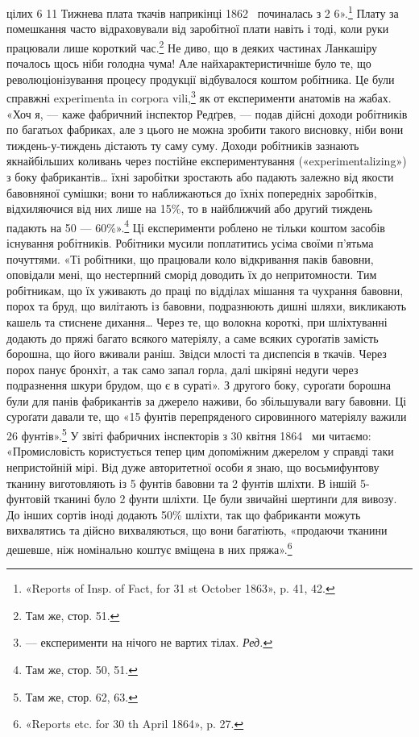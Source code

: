\parcont{}  %
цілих 6 11 Тижнева плата ткачів наприкінці
1862~ починалась з 2 6».\footnote{
«Reports of Insp. of Fact, for 31 st October 1863», p. 41, 42.
} Плату за помешкання
часто відраховували від заробітної плати навіть і тоді, коли
руки працювали лише короткий час.\footnote{
Там же, стор. 51.
} Не диво, що в деяких
частинах Ланкашіру почалось щось ніби голодна чума! Але найхарактеристичніше
було те, що революціонізування процесу продукції
відбувалося коштом робітника. Це були справжні experimenta
in corpora vili,\footnote*{
— експерименти на нічого не вартих тілах. \emph{Ред.}
} як от експерименти анатомів на жабах.
«Хоч я, — каже фабричний інспектор Редґрев, — подав дійсні
доходи робітників по багатьох фабриках, але з цього не можна
зробити такого висновку, ніби вони тиждень-у-тиждень дістають
ту саму суму. Доходи робітників зазнають якнайбільших
коливань через постійне експериментування («experimentalizing»)
з боку фабрикантів\dots{} їхні заробітки зростають або падають залежно
від якости бавовняної сумішки; вони то наближаються
до їхніх попередніх заробітків, відхиляючися від них лише на
15\%, то в найближчий або другий тиждень падають на 50 —
60\%».\footnote{
Там же, стор. 50, 51.
} Ці експерименти роблено не тільки коштом засобів
існування робітників. Робітники мусили поплатитись усіма своїми
п’ятьма почуттями. «Ті робітники, що працювали коло відкривання
паків бавовни, оповідали мені, що нестерпний сморід
доводить їх до непритомности. Тим робітникам, що їх уживають
до праці по відділах мішання та чухрання бавовни, порох та бруд,
що вилітають із бавовни, подразнюють дишні шляхи, викликають
кашель та стиснене дихання\dots{} Через те, що волокна короткі,
при шліхтуванні додають до пряжі багато всякого матеріялу, а
саме всяких суроґатів замість борошна, що його вживали раніш.
Звідси млості та диспепсія в ткачів. Через порох панує бронхіт,
а так само запал горла, далі шкіряні недуги через подразнення
шкури брудом, що є в сураті». З другого боку, суроґати борошна
були для панів фабрикантів за джерело наживи, бо збільшували
вагу бавовни. Ці суроґати давали те, що «15 фунтів перепряденого
сировинного матеріялу важили 26 фунтів».\footnote{
Там же, стор. 62, 63.
} У звіті фабричних
інспекторів з 30 квітня 1864~ ми читаємо: «Промисловість
користується тепер цим допоміжним джерелом у справді таки
непристойній мірі. Від дуже авторитетної особи я знаю, що восьмифунтову
тканину виготовляють із 5 фунтів бавовни та 2 фунтів
шліхти. В іншій 5-фунтовій тканині було 2 фунти шліхти.
Це були звичайні шертинґи для вивозу. До інших сортів іноді
додають 50\% шліхти, так що фабриканти можуть вихвалятись
та дійсно вихваляються, що вони багатіють, «продаючи тканини
дешевше, ніж номінально коштує вміщена в них пряжа».\footnote{
«Reports etc. for 30 th April 1864», p. 27.
}
\parbreak{}  %

